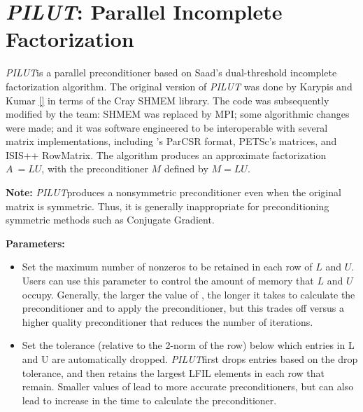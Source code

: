 \def\pilut{{\sl PILUT}}
\section{\pilut: Parallel Incomplete Factorization}
\label{PILUT}

\pilut is a parallel preconditioner based on Saad's dual-threshold incomplete
factorization algorithm. The original version of \pilut{} was done by Karypis and
Kumar \ref{} in terms of the Cray SHMEM library. The code was subsequently
modified by the \hypre team: SHMEM was replaced by MPI; some algorithmic
changes were made; and it was software engineered to be interoperable with
several matrix implementations, including \hypre 's ParCSR format, PETSc's
matrices, and ISIS++ RowMatrix. The algorithm produces an approximate
factorization $A ~= L U$, with the preconditioner $M$ defined by $ M = L U $.

{\bf Note:} \pilut produces a nonsymmetric preconditioner even when the
original matrix is symmetric. Thus, it is generally inappropriate for
preconditioning symmetric methods such as Conjugate Gradient.

{\bf Parameters:}

\begin{itemize}

\item
{}
Set the maximum number of nonzeros to be retained in each row of $L$ and $U$.
Users can use this parameter to control the amount of memory that $L$ and $U$
occupy. Generally, the larger the value of , the longer it takes to
calculate the preconditioner and to apply the preconditioner, but this trades
off versus a higher quality preconditioner that reduces the number of
iterations.

\item
{}
Set the tolerance (relative to the 2-norm of the row) below which entries in L
and U are automatically dropped. \pilut first drops entries based on the drop
tolerance, and then retains the largest LFIL elements in each row that remain.
Smaller values of  lead to more accurate preconditioners, but can
also lead to increase in the time to calculate the preconditioner.

\end{itemize}
